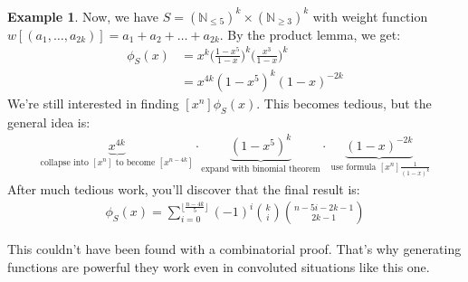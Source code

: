 \documentclass[]{article}
\theoremstyle{definition}
\newtheorem{ex}{Example}[section]
\begin{document}
\begin{ex}
					Now, we have $S = (\mathbb{N}_{\le 5})^k \times (\mathbb{N}_{\ge 3})^k$ with weight function $w[(a_1, \ldots, a_{2k})] = a_1 + a_2 + \ldots + a_{2k}$. By the product lemma, we get:
					\begin{align*}
						\phi_S(x) &= x^k \bigg(\frac{1 - x^5}{1 - x}\bigg)^k \bigg( \frac{x^3}{1 - x} \bigg)^k \\
						&= x^{4k}(1 - x^5)^k (1-x)^{-2k}
					\end{align*}
					We're still interested in finding $[x^n]\phi_S(x)$. This becomes tedious, but the general idea is:
					\begin{align*}
						[x^n] \underbrace{x^{4k}}_{\text{collapse into } [x^n] \text{ to become } [x^{n - 4k}]} \cdot \underbrace{(1 - x^5)^k}_{\text{expand with binomial theorem}} \cdot \underbrace{(1 - x)^{-2k}}_{\text{ use formula } [x^n]\frac{1}{(1 - x)^k}}
					\end{align*}
					After much tedious work, you'll discover that the final result is:
					\begin{align*}
						[x^n] \phi_S(x) = \sum_{i = 0}^{\lfloor \frac{n - 4k}{5} \rfloor} (-1)^i \binom{k}{i} \binom{n - 5i - 2k - 1}{2k - 1}
					\end{align*}

					This couldn't have been found with a combinatorial proof. That's why generating functions are powerful \textendash{} they work even in convoluted situations like this one.
				\end{ex}
\end{document}
